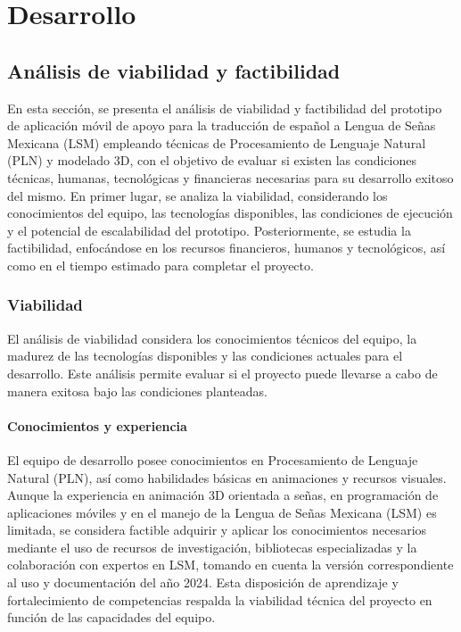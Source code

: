 \chapter{Desarrollo}
\section{Análisis de viabilidad y factibilidad}
En esta sección, se presenta el análisis de viabilidad y factibilidad del prototipo de aplicación móvil de apoyo para la traducción de español a Lengua de Señas Mexicana (LSM) empleando técnicas de Procesamiento de Lenguaje Natural (PLN) y modelado 3D, con el objetivo de evaluar si existen las condiciones técnicas, humanas, tecnológicas y financieras necesarias para su desarrollo exitoso del mismo. En primer lugar, se analiza la viabilidad, considerando los conocimientos del equipo, las tecnologías disponibles, las condiciones de ejecución y el potencial de escalabilidad del prototipo. Posteriormente, se estudia la factibilidad, enfocándose en los recursos financieros, humanos y tecnológicos, así como en el tiempo estimado para completar el proyecto.\\

\subsection{Viabilidad}
El análisis de viabilidad considera los conocimientos técnicos del equipo, la madurez de las tecnologías disponibles y las condiciones actuales para el desarrollo. Este análisis permite evaluar si el proyecto puede llevarse a cabo de manera exitosa bajo las condiciones planteadas.

\subsubsection{Conocimientos y experiencia}
El equipo de desarrollo posee conocimientos en Procesamiento de Lenguaje Natural (PLN), así como habilidades básicas en animaciones y recursos visuales. Aunque la experiencia en animación 3D orientada a señas, en programación de aplicaciones móviles y en el manejo de la Lengua de Señas Mexicana (LSM) es limitada, se considera factible adquirir y aplicar los conocimientos necesarios mediante el uso de recursos de investigación, bibliotecas especializadas y la colaboración con expertos en LSM, tomando en cuenta la versión correspondiente al uso y documentación del año 2024. Esta disposición de aprendizaje y fortalecimiento de competencias respalda la viabilidad técnica del proyecto en función de las capacidades del equipo.

